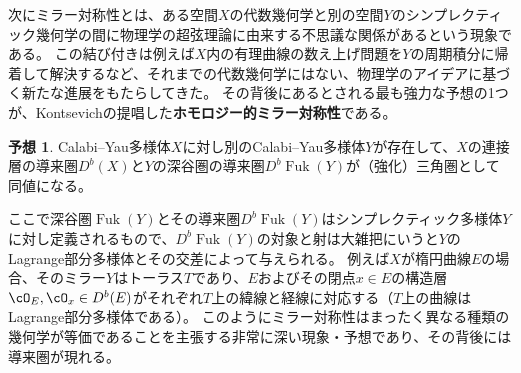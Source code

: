 \documentclass[uplatex,a4paper,dvipdfmx]{jsarticle}
\numberwithin{equation}{section}
\theoremstyle{definition}
\newtheorem{conjecture}[theorem]{予想}
\DeclareMathOperator{\Fuk}{Fuk}
\begin{document}
次にミラー対称性とは、ある空間$X$の代数幾何学と別の空間$Y$のシンプレクティック幾何学の間に物理学の超弦理論に由来する不思議な関係があるという現象である。
この結び付きは例えば$X$内の有理曲線の数え上げ問題を$Y$の周期積分に帰着して解決するなど、それまでの代数幾何学にはない、物理学のアイデアに基づく新たな進展をもたらしてきた。
その背後にあるとされる最も強力な予想の1つが、Kontsevichの提唱した\textbf{ホモロジー的ミラー対称性}である。
\begin{conjecture}
	Calabi--Yau多様体$X$に対し別のCalabi--Yau多様体$Y$が存在して、$X$の連接層の導来圏$D^b (X)$と$Y$の深谷圏の導来圏$D^b \Fuk(Y)$が（強化）三角圏として同値になる。
\end{conjecture}
ここで深谷圏$\Fuk(Y)$とその導来圏$D^b \Fuk(Y)$はシンプレクティック多様体$Y$に対し定義されるもので、$D^b \Fuk(Y)$の対象と射は大雑把にいうと$Y$のLagrange部分多様体とその交差によって与えられる。
例えば$X$が楕円曲線$E$の場合、そのミラー$Y$はトーラス$T$であり、$E$およびその閉点$x \in E$の構造層$\cO_E, \cO_x \in D^b(E)$がそれぞれ$T$上の緯線と経線に対応する（$T$上の曲線はLagrange部分多様体である）。
このようにミラー対称性はまったく異なる種類の幾何学が等価であることを主張する非常に深い現象・予想であり、その背後には導来圏が現れる。
\end{document}
